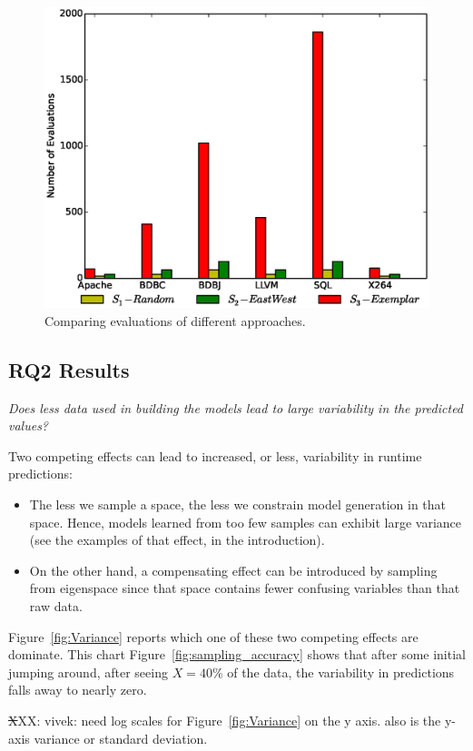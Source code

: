 \documentclass{sig-alternative}
\newcommand{\bi}{\begin{itemize}}%
\newcommand{\ei}{\end{itemize}}
\newcommand{\fig}[1]{Figure~\ref{fig:#1}}
\begin{document}
\begin{figure}[!t]
\includegraphics[width=0.9\linewidth]{Figures/evaluation_graph.eps}
\caption{ Comparing evaluations of different approaches. }\label{fig:Evaluations}
\end{figure}


\subsection{RQ2 Results}

{\em
Does less data used in building the models lead to large variability in the predicted values?}

Two competing effects can lead to increased, or less,  variability  in 
runtime predictions:
\bi
\item
The less we sample a space,
the less we constrain model generation in that space. Hence, models learned
from too few samples can exhibit large variance (see the examples of that effect,
in the introduction). 
\item
On the other hand, a compensating effect can be introduced by sampling from eigenspace
since that space contains fewer confusing variables than that raw data.
\ei
\fig{Variance} reports which one of these two competing effects are dominate. 
This chart \fig{sampling_accuracy} shows that after some initial jumping around,
after seeing $X=40$\% of the data, the variability in predictions falls away to nearly zero.

{\st XXX: vivek: need log scales for \fig{Variance} on the y axis. also is the y-axis variance or standard deviation.}
\end{document}
